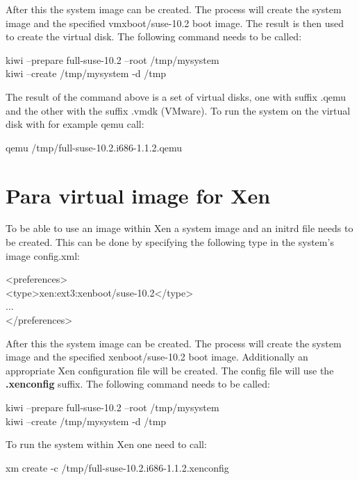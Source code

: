 After this the system image can be created. The process will create the
system image and the specified vmxboot/suse-10.2 boot image. The result
is then used to create the virtual disk. The following command needs
to be called:

\begin{Command}{14cm}
	kiwi --prepare full-suse-10.2 --root /tmp/mysystem\\
	kiwi --create /tmp/mysystem -d /tmp
\end{Command}

The result of the command above is a set of virtual disks, one with
suffix .qemu and the other with the suffix .vmdk (VMware). To run the
system on the virtual disk with for example qemu call:

\begin{Command}{14cm}
	qemu /tmp/full-suse-10.2.i686-1.1.2.qemu
\end{Command}

\section{Para virtual image for Xen}
To be able to use an image within Xen a system image and an initrd file
needs to be created. This can be done by specifying the following type in the
system's image config.xml:

\begin{Command}{14cm}
<preferences>\\
\hspace*{1cm}<type>xen:ext3:xenboot/suse-10.2</type>\\
\hspace*{1cm}...\\
</preferences>
\end{Command}

After this the system image can be created. The process will create the
system image and the specified xenboot/suse-10.2 boot image. Additionally
an appropriate Xen configuration file will be created. The config file
will use the \textbf{.xenconfig} suffix. The following command needs
to be called:

\begin{Command}{14cm}
    kiwi --prepare full-suse-10.2 --root /tmp/mysystem\\
    kiwi --create /tmp/mysystem -d /tmp
\end{Command}

To run the system within Xen one need to call:

\begin{Command}{14cm}
   xm create -c /tmp/full-suse-10.2.i686-1.1.2.xenconfig
\end{Command}

